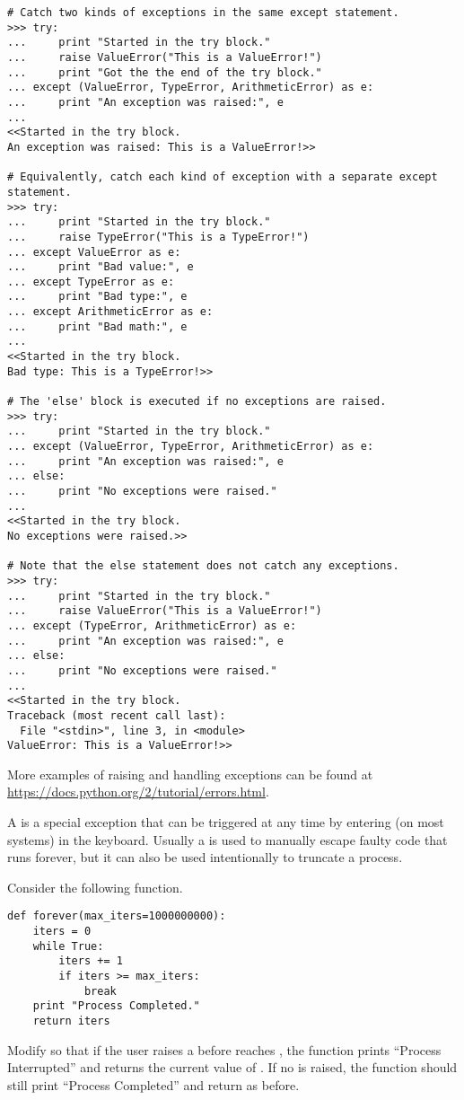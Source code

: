 \begin{lstlisting}
# Catch two kinds of exceptions in the same except statement.
>>> try:
...     print "Started in the try block."
...     raise ValueError("This is a ValueError!")
...     print "Got the the end of the try block."
... except (ValueError, TypeError, ArithmeticError) as e:
...     print "An exception was raised:", e
...
<<Started in the try block.
An exception was raised: This is a ValueError!>>

# Equivalently, catch each kind of exception with a separate except statement.
>>> try:
...     print "Started in the try block."
...     raise TypeError("This is a TypeError!")
... except ValueError as e:
...     print "Bad value:", e
... except TypeError as e:
...     print "Bad type:", e
... except ArithmeticError as e:
...     print "Bad math:", e
...
<<Started in the try block.
Bad type: This is a TypeError!>>

# The 'else' block is executed if no exceptions are raised.
>>> try:
...     print "Started in the try block."
... except (ValueError, TypeError, ArithmeticError) as e:
...     print "An exception was raised:", e
... else:
...     print "No exceptions were raised."
...
<<Started in the try block.
No exceptions were raised.>>

# Note that the else statement does not catch any exceptions.
>>> try:
...     print "Started in the try block."
...     raise ValueError("This is a ValueError!")
... except (TypeError, ArithmeticError) as e:
...     print "An exception was raised:", e
... else:
...     print "No exceptions were raised."
...
<<Started in the try block.
Traceback (most recent call last):
  File "<stdin>", line 3, in <module>
ValueError: This is a ValueError!>>
\end{lstlisting}

More examples of raising and handling exceptions can be found at \url{https://docs.python.org/2/tutorial/errors.html}.

\begin{problem}
A  is a special exception that can be triggered at any time by entering  (on most systems) in the keyboard.
Usually a  is used to manually escape faulty code that runs forever, but it can also be used intentionally to truncate a process.

Consider the following function.

\begin{lstlisting}
def forever(max_iters=1000000000):
    iters = 0
    while True:
        iters += 1
        if iters >= max_iters:
            break
    print "Process Completed."
    return iters
\end{lstlisting}
Modify  so that if the user raises a  before  reaches , the function prints ``Process Interrupted'' and returns the current value of .
If no  is raised, the function should still print ``Process Completed'' and return  as before.
\end{problem}

